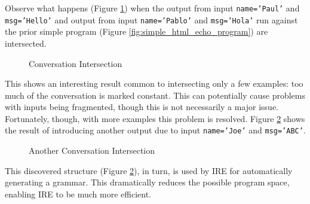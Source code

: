 Observe what happens (Figure \ref{fig:conversation_intersection}) when the output from input \texttt{name='Paul'} and \texttt{msg='Hello'} and output from input \texttt{name='Pablo'} and \texttt{msg='Hola'} run against the prior simple program (Figure \ref{fig:simple_html_echo_program}) are intersected.

\begin{figure}[tb]
\caption{Conversation Intersection}
\label{fig:conversation_intersection}
\end{figure}

This shows an interesting result common to intersecting only a few examples: too much of the conversation is marked constant.
This can potentially cause problems with inputs being fragmented, though this is not necessarily a major issue.
Fortunately, though, with more examples this problem is resolved.
Figure \ref{fig:another_conversation_intersection} shows the result of introducing another output due to input \texttt{name='Joe'} and \texttt{msg='ABC'}.

\begin{figure}[tb]
\caption{Another Conversation Intersection}
\label{fig:another_conversation_intersection}
\end{figure}

This discovered structure (Figure \ref{fig:another_conversation_intersection}), in turn, is used by IRE for automatically generating a grammar.
This dramatically reduces the possible program space, enabling IRE to be much more efficient.
